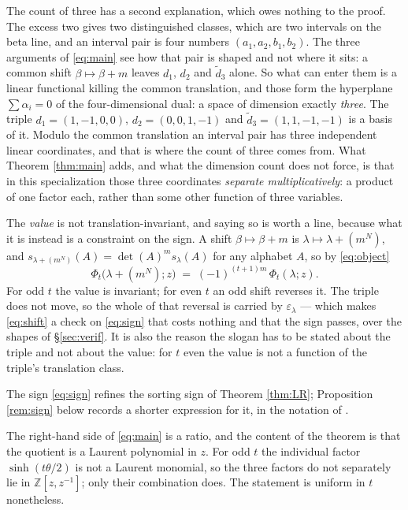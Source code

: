 \documentclass[11pt,reqno]{amsart}
\theoremstyle{plain}
\theoremstyle{definition}
\newcommand{\ZZ}{\mathbb{Z}}
\begin{document}
The count of three has a second explanation, which owes nothing to the proof. The excess two gives
two distinguished classes, which are two intervals on the beta line, and an interval pair is four
numbers $(a_1,a_2,b_1,b_2)$. The three arguments of \eqref{eq:main} see how that pair is shaped and
not where it sits: a common shift $\beta\mapsto\beta+m$ leaves $d_1$, $d_2$ and $\tilde d_3$ alone.
So what can enter them is a linear functional killing the common translation, and those form the
hyperplane $\sum\alpha_i=0$ of the four-dimensional dual: a space of dimension exactly \emph{three}.
The triple $d_1=(1,-1,0,0)$, $d_2=(0,0,1,-1)$ and $\tilde d_3=(1,1,-1,-1)$ is a basis of it. Modulo
the common translation an interval pair has three independent linear coordinates, and that is where
the count of three comes from. What Theorem \ref{thm:main} adds, and what the dimension count does
not force, is that in this specialization those three coordinates \emph{separate multiplicatively}:
a product of one factor each, rather than some other function of three variables.

The \emph{value} is not translation-invariant, and saying so is worth a line, because what it is
instead is a constraint on the sign. A shift $\beta\mapsto\beta+m$ is $\lambda\mapsto\lambda+(m^N)$,
and $s_{\lambda+(m^N)}(A)=\det(A)^{m}s_\lambda(A)$ for any alphabet $A$, so by \eqref{eq:object}
\begin{equation}\label{eq:shift}
\Phi_t\bigl(\lambda+(m^N);z\bigr)\;=\;(-1)^{(t+1)m}\,\Phi_t(\lambda;z).
\end{equation}
For odd $t$ the value is invariant; for even $t$ an odd shift reverses it. The triple does not move,
so the whole of that reversal is carried by $\varepsilon_\lambda$ --- which makes \eqref{eq:shift} a
check on \eqref{eq:sign} that costs nothing and that the sign passes, over the shapes of
\S\ref{sec:verif}. It is also the reason the slogan has to be stated about the triple and not about
the value: for $t$ even the value is not a function of the triple's translation class.

The sign \eqref{eq:sign} refines the sorting sign of Theorem
\ref{thm:LR}; Proposition \ref{rem:sign} below records a shorter expression for it, in the notation
of \cite{AK25}.

The right-hand side of \eqref{eq:main} is a ratio, and the content of the theorem is that the quotient is a Laurent polynomial
in $z$. For odd $t$ the individual factor $\sinh(t\theta/2)$ is not a Laurent monomial, so the three
factors do not separately lie in $\ZZ[z,z^{-1}]$; only their combination does. The statement is
uniform in $t$ nonetheless.
\end{document}
